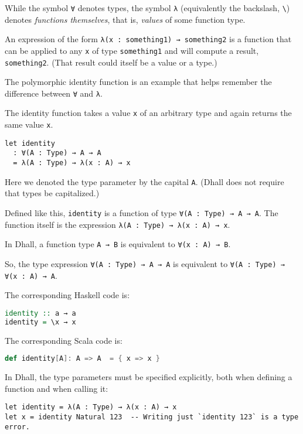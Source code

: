 While the symbol \lstinline!∀! denotes types, the symbol \lstinline!λ! (equivalently the backslash, \lstinline!\!) denotes \emph{functions themselves}, that is, \emph{values} of some function type.


An expression of the form \lstinline!λ(x : something1) → something2! is a function that can be applied to any \lstinline!x! of type \lstinline!something1! and will compute a result, \lstinline!something2!. (That result could itself be a value or a type.)


The polymorphic identity function is an example that helps remember the difference between \lstinline!∀! and \lstinline!λ!.


The identity function takes a value \lstinline!x! of an arbitrary type and again returns the same value \lstinline!x!.


\begin{lstlisting}[language=Dhall]
let identity
  : ∀(A : Type) → A → A
  = λ(A : Type) → λ(x : A) → x
\end{lstlisting}


Here we denoted the type parameter by the capital \lstinline!A!. (Dhall does not require that types be capitalized.)


Defined like this, \lstinline!identity! is a function of type \lstinline!∀(A : Type) → A → A!. The function itself is the expression \lstinline!λ(A : Type) → λ(x : A) → x!.


In Dhall, a function type \lstinline!A → B! is equivalent to \lstinline!∀(x : A) → B!.


So, the type expression \lstinline!∀(A : Type) → A → A! is equivalent to \lstinline!∀(A : Type) → ∀(x : A) → A!.


The corresponding Haskell code is:


\begin{lstlisting}[language=Haskell]
identity :: a → a
identity = \x → x
\end{lstlisting}


The corresponding Scala code is:


\begin{lstlisting}[language=Scala]
def identity[A]: A => A  = { x => x }
\end{lstlisting}


In Dhall, the type parameters must be specified explicitly, both when defining a function and when calling it:


\begin{lstlisting}[language=Dhall]
let identity = λ(A : Type) → λ(x : A) → x
let x = identity Natural 123  -- Writing just `identity 123` is a type error.
\end{lstlisting}


